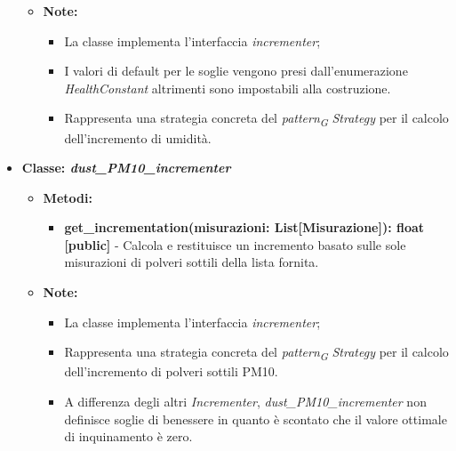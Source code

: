 \begin{itemize}
\begin{itemize}
\begin{itemize}
    \end{itemize}
    \item\textbf{Note:}
        \begin{itemize}
            \item La classe implementa l'interfaccia \textit{incrementer};
            \item I valori di default per le soglie vengono presi dall'enumerazione \textit{HealthConstant} altrimenti sono impostabili alla costruzione.
            \item Rappresenta una strategia concreta del \textit{pattern}\textsubscript{\textit{G}} \textit{Strategy} per il calcolo dell'incremento di umidità.
        \end{itemize}
    \end{itemize}\item{\textbf{Classe: \textit{dust\_PM10\_incrementer}}}
    \begin{itemize}
    \item \textbf{Metodi: } 
    \begin{itemize}
        \item \textbf{get\_incrementation(misurazioni: List[Misurazione]): float [public]} - Calcola e restituisce un incremento basato sulle sole misurazioni di polveri sottili della lista fornita.
    \end{itemize}
    \item\textbf{Note:}
        \begin{itemize}
            \item La classe implementa l'interfaccia \textit{incrementer};
            \item Rappresenta una strategia concreta del \textit{pattern}\textsubscript{\textit{G}} \textit{Strategy} per il calcolo dell'incremento di polveri sottili PM10.
            \item A differenza degli altri \textit{Incrementer}, \textit{dust\_PM10\_incrementer} non definisce soglie di benessere in quanto è scontato che il valore ottimale di inquinamento è zero.
        \end{itemize}
    \end{itemize}

\end{itemize}

